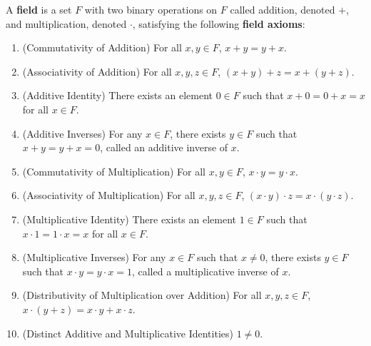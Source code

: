 \documentclass[../main.tex]{subfiles}
\begin{document}
\begin{definition}\label{dfn:7.8}
    A \textbf{field} is a set $F$ with two binary operations on $F$ called addition, denoted $+$, and multiplication, denoted $\cdot$, satisfying the following \textbf{field axioms}:
    \begin{enumerate}[label={FA\arabic*}]
        \item (Commutativity of Addition) For all $x,y\in F$, $x+y=y+x$.
        \item (Associativity of Addition) For all $x,y,z\in F$, $(x+y)+z=x+(y+z)$.
        \item (Additive Identity) There exists an element $0\in F$ such that $x+0=0+x=x$ for all $x\in F$.
        \item (Additive Inverses) For any $x\in F$, there exists $y\in F$ such that $x+y=y+x=0$, called an additive inverse of $x$.
        \item (Commutativity of Multiplication) For all $x,y\in F$, $x\cdot y=y\cdot x$.
        \item (Associativity of Multiplication) For all $x,y,z\in F$, $(x\cdot y)\cdot z=x\cdot(y\cdot z)$.
        \item (Multiplicative Identity) There exists an element $1\in F$ such that $x\cdot 1=1\cdot x=x$ for all $x\in F$.
        \item (Multiplicative Inverses) For any $x\in F$ such that $x\neq 0$, there exists $y\in F$ such that $x\cdot y=y\cdot x=1$, called a multiplicative inverse of $x$.
        \item (Distributivity of Multiplication over Addition) For all $x,y,z\in F$, $x\cdot(y+z)=x\cdot y+x\cdot z$.
        \item (Distinct Additive and Multiplicative Identities) $1\neq 0$.
    \end{enumerate}
\end{definition}
\end{document}
